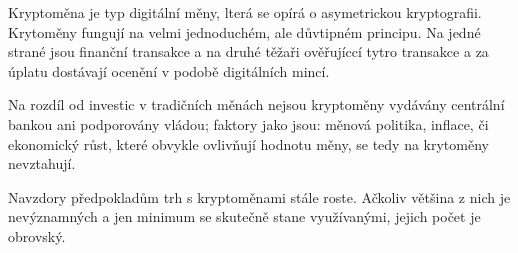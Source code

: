\documentclass[a4paper, 11pt]{article}
\begin{document}
Kryptoměna je typ digitální měny, lterá se opírá o asymetrickou kryptografii.\cite{wiki:Kryptomena}
Krytoměny fungují na velmi jednoduchém, ale důvtipném principu. Na jedné strané jsou finanční transakce a na druhé těžaři ověřujíccí tytro transakce a za úplatu dostávají ocenění v podobě digitálních mincí.\cite{Panek:Novy_usvit_tezby}

Na rozdíl od investic v tradičních měnách nejsou kryptoměny vydávány centrální bankou ani podporovány vládou; faktory jako jsou: měnová politika, inflace, či ekonomický růst, které obvykle ovlivňují hodnotu měny, se tedy na krytoměny nevztahují.\cite{Bloomenthal:What_Determines_the_Price_of_1_Bitcoin}

\bigskip
Navzdory předpokladům trh s kryptoměnami stále roste. Ačkoliv většina z nich je nevýznamných a jen minimum se skutečně stane využívanými, jejich počet je obrovský.\cite{Computerworld:Trh_kryptomen_stale_zaplavuji_nove_meny}

\newpage

\end{document}
